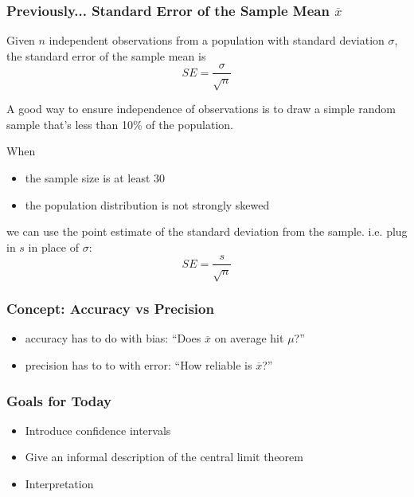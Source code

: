 \documentclass[handout]{beamer}
\newcommand{\blue}[1]{\textcolor{blue2}{#1}}
\newcommand{\xbar}{\overline{x}}
\begin{document}
\begin{frame}[fragile]
\frametitle{Previously... Standard Error of the Sample Mean $\xbar$}

Given $n$ independent observations from a population with standard deviation $\sigma$, the \blue{standard error of the sample mean} is
\[
SE = \frac{\sigma}{\sqrt{n}}
\]

\pause A good way to ensure independence of observations is to draw a simple random sample that's less than 10\% of the population.  

\vspace{0.5cm}

\pause When
\begin{itemize}
\item the sample size is at least 30
\item the population distribution is \blue{not} strongly skewed
\end{itemize}
\pause we can use the point estimate of the standard deviation from the sample.  i.e. plug in $s$ in place of $\sigma$:
\[
SE = \frac{s}{\sqrt{n}}
\]

\end{frame}





\begin{frame}[fragile]
\frametitle{Concept:  Accuracy vs Precision}

\begin{itemize}
\pause \item \blue{accuracy} has to do with bias:  ``Does $\overline{x}$ on average hit $\mu$?''
\pause \item \blue{precision} has to to with error:  ``How reliable is $\overline{x}$?''
\end{itemize}

\vspace{5cm}

\end{frame}





\begin{frame}[fragile]
\frametitle{Goals for Today}

\begin{itemize}
\item Introduce confidence intervals
\item Give an informal description of the central limit theorem
\item Interpretation
\end{itemize}

\end{frame}
\end{document}
